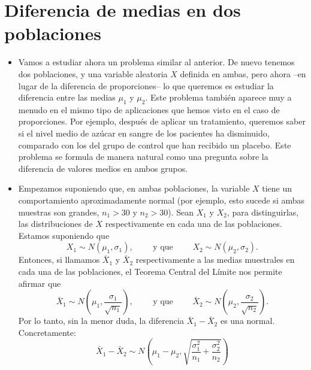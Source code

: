 \section{Diferencia de medias en dos poblaciones}\label{sec:diferenciaMediasDosPoblaciones}

\begin{itemize}

    \item Vamos a estudiar ahora un problema similar al anterior. De nuevo tenemos dos poblaciones, y una variable aleatoria $X$ definida en ambas, pero ahora --en lugar de la diferencia de proporciones-- lo que queremos es estudiar la diferencia entre las medias $\mu_1$ y $\mu_2$. Este problema también aparece muy a menudo en el mismo tipo de aplicaciones que hemos visto en el caso de proporciones. Por ejemplo, después de aplicar un tratamiento, queremos saber si el nivel medio de azúcar en sangre de los pacientes ha disminuido, comparado con los del grupo de control que han recibido un placebo. Este problema se formula de manera natural como una pregunta sobre la diferencia de valores medios en ambos grupos.

    \item Empezamos suponiendo que, en ambas poblaciones, la variable $X$ tiene un comportamiento aproximadamente normal (por ejemplo, esto sucede si ambas muestras son grandes, $n_1>30$ y $n_2>30$). Sean $X_1$ y $X_2$, para distinguirlas, las distribuciones de $X$ respectivamente en cada una de las poblaciones. Estamos suponiendo que
        \[X_1\sim N\left(\mu_1,\sigma_1\right),\qquad\mbox{ y que }\qquad X_2\sim N\left(\mu_2,\sigma_2\right).\]
        Entonces, si llamamos $\bar X_1$ y $\bar X_2$ respectivamente a las medias muestrales en cada una de las poblaciones, el Teorema Central del Límite  nos permite afirmar que
        \[\bar X_1\sim N\left(\mu_1,\dfrac{\sigma_1}{\sqrt{n_1}}\right),\qquad\mbox{ y que }\qquad \bar X_2\sim N\left(\mu_2,\dfrac{\sigma_2}{\sqrt{n_2}}\right).\]
        Por lo tanto, sin la menor duda, la diferencia $\bar X_1-\bar X_2$ es una normal. Concretamente:
        \[\bar X_1-\bar X_2\sim N\left(\mu_1-\mu_2,\sqrt{\dfrac{\sigma_1^2}{n_1}+\dfrac{\sigma_2^2}{n_2}}\right)\]



\end{itemize}
